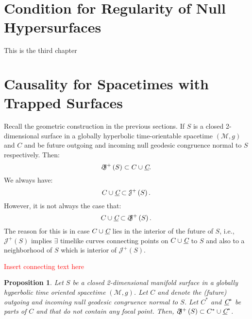 \documentclass[12pt, a4paper]{report}
\theoremstyle{bfnote}
\newtheorem{proposition}{Proposition}[section]
\begin{document}
\section{Condition for Regularity of Null Hypersurfaces}
This is the third chapter

\section{Causality for Spacetimes with Trapped Surfaces}
Recall the geometric construction in the previous sections. If $S$ is a closed
2-dimensional surface in a globally hyperbolic time-orientable spacetime
$\left(\mathcal{M}, g\right)$ and $C$ and \textit{} be future
outgoing and incoming null geodesic congruence normal to $S$ respectively. Then:
\begin{equation}
    \partial\hspace{-0.3em}\mathcal{J}^+\left(S\right) \subset C \cup \textit{\underbar{C}}.
\end{equation}
We always have:
\begin{equation}
    C \cup \textit{\underbar{C}} \subset \mathcal{J}^+\left(S\right).
\end{equation}
However, it is not always the case that:
\begin{equation}\label{eq:BCnotalwaystrue}
    C \cup \textit{\underbar{C}} \subset \partial\hspace{-0.3em}\mathcal{J}^+\left(S\right).
\end{equation}
The reason for this is in case $C \cup \textit{\underbar{C}}$ lies in the
interior of the future of $S$, i.e., $\mathcal{J}^+\left(S\right)$ implies
$\exists$ timelike curves connecting points on $C \cup \textit{\underbar{C}}$ to
$S$ and also to a neighborhood of $S$ which is interior of
$\mathcal{J}^+\left(S\right)$.

\textcolor{red}{Insert connecting text here}

\begin{proposition}
    Let $S$ be a closed 2-dimensional manifold surface in a globally hyperbolic
    time oriented spacetime $\left(\mathcal{M}, g\right)$. Let $C$ and
    \textit{} denote the (future) outgoing and incoming null
    geodesic congruence normal to $S$. Let $C^*$ and $\textit{\underbar{C}}^*$
    be parts of $C$ and \textit{} that do not contain any focal
    point. Then, $\partial\hspace{-0.3em}\mathcal{J}^+\left(S\right) \subset C^*
    \cup \textit{\underbar{C}}^*$.
\end{proposition}
\end{document}
